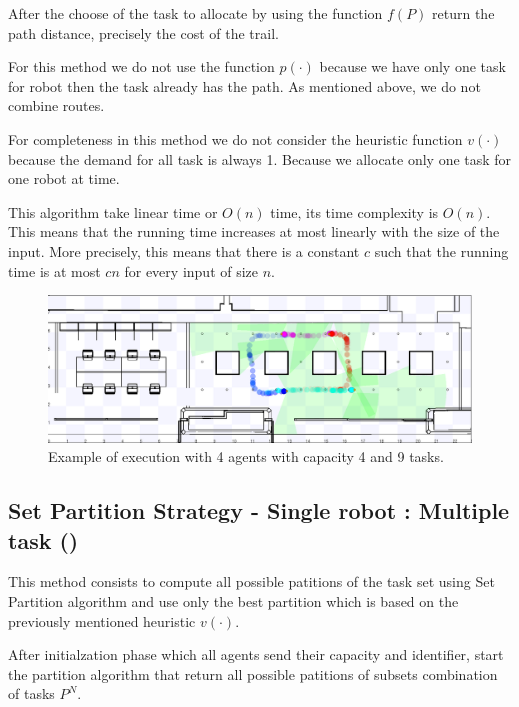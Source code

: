 After the choose of the task to allocate by using the function $f(P)$ return the path distance, precisely the cost of the trail.

For this method we do not use the function $p(\cdot)$ because we have only one task for robot
then the task already has the path. As mentioned above, we do not combine routes.

For completeness in this method we do not consider the heuristic function $v(\cdot)$ because the demand for all
task is always 1. Because we allocate only one task for one robot at time.

This algorithm take linear time or $O(n)$ time, its time complexity is $O(n)$.
This means that the running time increases at most linearly with the size of the input.
More precisely, this means that there is a constant $c$ such that the running time is 
at most $cn$ for every input of size $n$.



\begin{figure} [hbt]
  \centering
  \includegraphics[width=\textwidth]{img/cycle1.png}
  \caption{Example of execution \srst with 4 agents with capacity 4 and 9 tasks.}
  \label{fig:srst}
\end{figure}



\subsection{Set Partition Strategy - Single robot : Multiple task (\sps)}

This method consists to compute all possible patitions of the task set 
using Set Partition algorithm \cite{partition} and use only 
the best partition which is based on the previously mentioned heuristic $v(\cdot)$.

After initialzation phase which all agents send their capacity and identifier,
start the partition algorithm \cite{partition} that return all possible patitions of subsets combination 
of tasks $P^N$.

